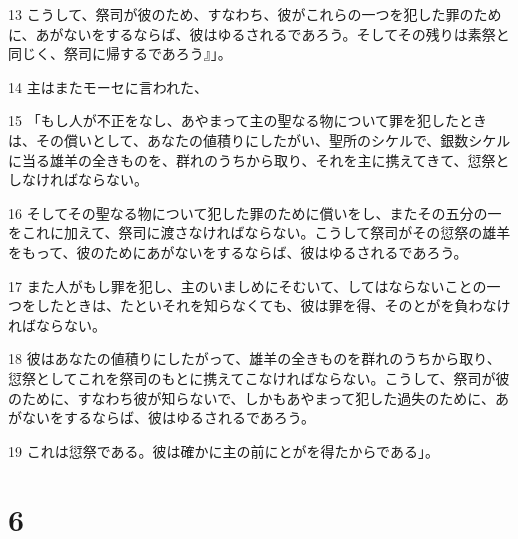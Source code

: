 \par 13 こうして、祭司が彼のため、すなわち、彼がこれらの一つを犯した罪のために、あがないをするならば、彼はゆるされるであろう。そしてその残りは素祭と同じく、祭司に帰するであろう』」。
\par 14 主はまたモーセに言われた、
\par 15 「もし人が不正をなし、あやまって主の聖なる物について罪を犯したときは、その償いとして、あなたの値積りにしたがい、聖所のシケルで、銀数シケルに当る雄羊の全きものを、群れのうちから取り、それを主に携えてきて、愆祭としなければならない。
\par 16 そしてその聖なる物について犯した罪のために償いをし、またその五分の一をこれに加えて、祭司に渡さなければならない。こうして祭司がその愆祭の雄羊をもって、彼のためにあがないをするならば、彼はゆるされるであろう。
\par 17 また人がもし罪を犯し、主のいましめにそむいて、してはならないことの一つをしたときは、たといそれを知らなくても、彼は罪を得、そのとがを負わなければならない。
\par 18 彼はあなたの値積りにしたがって、雄羊の全きものを群れのうちから取り、愆祭としてこれを祭司のもとに携えてこなければならない。こうして、祭司が彼のために、すなわち彼が知らないで、しかもあやまって犯した過失のために、あがないをするならば、彼はゆるされるであろう。
\par 19 これは愆祭である。彼は確かに主の前にとがを得たからである」。

\chapter{6}

